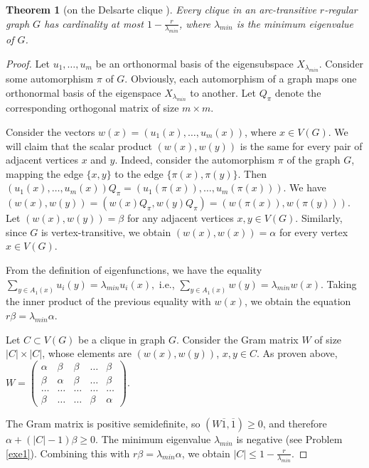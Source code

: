 \documentclass[11pt]{article}
\newtheorem{theorem}{Theorem}[section]
\theoremstyle{definition}
\begin{document}
\begin{theorem}[on the Delsarte clique \cite{Godsil}]\label{PCclaim13}
Every clique in an arc-transitive $r$-regular graph $G$ has cardinality at most
 $1-\frac{r}{\lambda_{min}}$, where $\lambda_{min}$ is the minimum
eigenvalue of $G$.
\end{theorem}
\begin{proof}
Let $u_1,\dots,u_m$ be an orthonormal basis of the eigensubspace $X_{\lambda_{min}}$. Consider some automorphism $\pi$
of $G$. Obviously, each automorphism of a graph maps one orthonormal basis of the eigenspace $X_{\lambda_{min}}$ to another. Let $Q_{\pi}$ denote the corresponding orthogonal matrix of size $m\times m$.

Consider the vectors
$w(x)=(u_1(x),\dots,u_m(x))$, where $x\in V(G)$. We will claim that the
scalar product $(w(x),w(y))$ is the same for every pair of adjacent vertices $x$ and
$y$. Indeed, consider the automorphism $\pi$ of the graph $G$,
mapping the edge $\{x,y\}$ to the edge $\{\pi(x),\pi(y)\}$. Then
$(u_1(x),\dots,u_m(x))Q_\pi=(u_1(\pi(x)),\dots,u_m(\pi(x)))$. We have
$(w(x),w(y))=(w(x)Q_\pi,w(y)Q_\pi)=(w(\pi(x)),w(\pi(y)))$. Let
$(w(x),w(y))=\beta$ for any adjacent vertices $x,y\in V(G)$.
Similarly, since $G$ is vertex-transitive, we obtain $(w(x),w(x))=\alpha$ for every
vertex $x\in V(G)$.




From the definition of  eigenfunctions, we have the equality $
\sum\limits_{y\in A_1(x)}u_i(y)=\lambda_{min} u_i(x),$ i.e., $
\sum\limits_{y\in A_1(x)}w(y)=\lambda_{min} w(x)$. Taking the inner product of the previous equality with $w(x)$, we obtain the equation
$r\beta=\lambda_{min}\alpha$.

Let $C\subset V(G)$ be a clique in graph $G$. Consider the Gram matrix
$W$ of size $|C|\times |C|$, whose elements are
$(w(x),w(y))$, $x,y\in C$.
As proven
above, $W=\begin{pmatrix}
\alpha & \beta & \beta & \dots & \beta\\
\beta & \alpha & \beta& \dots & \beta\\
\dots & \dots & \dots & \dots & \dots \\
\beta & \dots & \dots & \beta & \alpha
\end{pmatrix}$.

The Gram matrix is positive semidefinite, so
$(W\overline{1},\overline{1})\geq 0$, and therefore $\alpha+
(|C|-1)\beta\geq 0$. The minimum eigenvalue
$\lambda_{min}$ is negative (see Problem \ref{exe1}). Combining this with
 $r\beta=\lambda_{min}\alpha$, we obtain $|C|\leq
1-\frac{r}{\lambda_{min}}$.
\end{proof}
\end{document}
